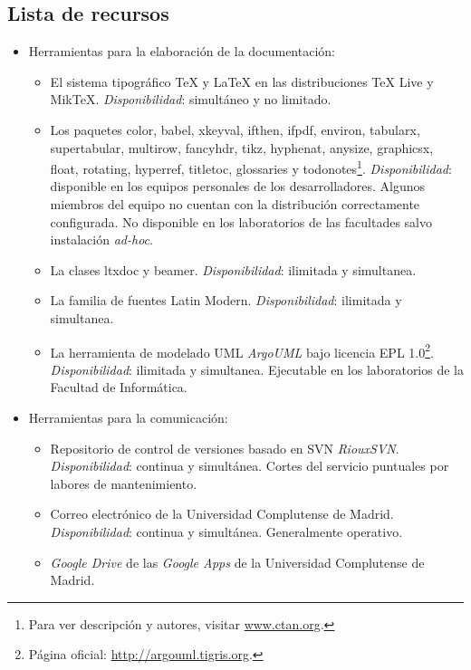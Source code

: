 \documentclass[11pt, a4paper, twoside]{report}
\begin{document}
		\subsection{Lista de recursos}
			\begin{itemize}
				\item Herramientas para la elaboración de la documentación: \begin{itemize}
					\item El sistema tipográfico {\rmfamily \TeX{}} y {\rmfamily\LaTeX{}} en las distribuciones {\rmfamily\TeX{} Live} y {\rmfamily Mik\TeX{}}.
					\subitem \textit{Disponibilidad}: simultáneo y no limitado.
					\item Los paquetes {\rmfamily color}, {\rmfamily babel}, {\rmfamily xkeyval}, {\rmfamily ifthen}, {\rmfamily ifpdf}, {\rmfamily environ}, {\rmfamily tabularx}, {\rmfamily supertabular}, {\rmfamily multirow}, {\rmfamily fancyhdr}, {\rmfamily tikz}, {\rmfamily hyphenat}, {\rmfamily anysize}, {\rmfamily graphicsx}, {\rmfamily float}, {\rmfamily rotating}, {\rmfamily hyperref}, {\rmfamily titletoc}, {\rmfamily glossaries} y {\rmfamily todonotes}\footnote{Para ver descripción y autores, visitar \url{www.ctan.org}.}.
					\subitem \textit{Disponibilidad}: disponible en los equipos personales de los desarrolladores. Algunos miembros del equipo no cuentan con la distribución correctamente configurada. No disponible en los laboratorios de las facultades salvo instalación \textit{ad-hoc}.
					\item La clases {\rmfamily ltxdoc} y {\rmfamily beamer}.
					\subitem \textit{Disponibilidad}: ilimitada y simultanea.
					\item La familia de fuentes {\rmfamily Latin Modern}.
					\subitem \textit{Disponibilidad}: ilimitada y simultanea.
					\item La herramienta de modelado UML \textit{ArgoUML} bajo licencia EPL 1.0\footnote{Página oficial: \url{http://argouml.tigris.org}.}.
					\subitem \textit{Disponibilidad}: ilimitada y simultanea. Ejecutable en los laboratorios de la Facultad de Informática.
				\end {itemize}
				
				\item Herramientas para la comunicación: \begin{itemize}
					\item Repositorio de control de versiones basado en SVN \textit{RiouxSVN}.
					\subitem \textit{Disponibilidad}: continua y simultánea. Cortes del servicio puntuales por labores de mantenimiento.
					\item Correo electrónico de la Universidad Complutense de Madrid.
					\subitem \textit{Disponibilidad}: continua y simultánea. Generalmente operativo.
					\item \textit{Google Drive} de las \textit{Google Apps} de la Universidad Complutense de Madrid.
				\end{itemize}


\end{itemize}
\end{document}

